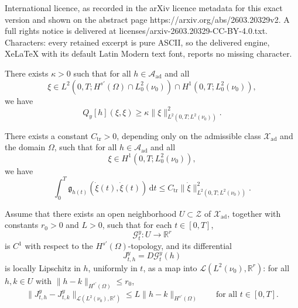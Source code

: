 \documentclass[10pt,a4paper]{amsart}
\renewcommand{\d}{\mathrm{d}}
\begin{document}
International licence, as recorded in the arXiv licence metadata for this exact version and shown on the abstract page https://arxiv.org/abs/2603.20329v2. A full rights notice is delivered at licenses/arxiv-2603.20329-CC-BY-4.0.txt. Characters: every retained excerpt is pure ASCII, so the delivered engine, XeLaTeX with its default Latin Modern text font, reports no missing character.
\begin{assumption}
    \label{ass:joint-transport-observability}
    There exists \(\kappa>0\) such that for all \(h\in \mathcal A_{\mathrm{ad}}\) and all
    \[
        \xi\in L^2(0,T;H^{s'}(\Omega)\cap L^2_0(\nu_0))
        \cap H^1(0,T;L^2_0(\nu_0)),
    \]
    we have
    \begin{equation}
        \label{eq:joint-coercivity}
        Q_y[h](\xi,\xi)
        \ge
        \kappa \|\xi\|_{L^2(0,T;L^2(\nu_0))}^2.
    \end{equation}
\end{assumption}

\begin{proposition}
    \label{prop:transport-term-upper-bound}
    There exists a constant \(C_{\mathrm{tr}}>0\), depending only on the admissible class
    \(\mathcal X_{\mathrm{ad}}\) and the domain \(\Omega\), such that for all
    \(h\in\mathcal A_{\mathrm{ad}}\) and all
    \[
        \xi\in H^1(0,T;L^2_0(\nu_0)),
    \]
    we have
    \[
        \int_0^T \mathfrak g_{h(t)}(\dot\xi(t),\dot\xi(t))\,\d t
        \le
        C_{\mathrm{tr}}\|\dot\xi\|_{L^2(0,T;L^2(\nu_0))}^2.
    \]
\end{proposition}

\begin{assumption}
    \label{ass:observation-regularity}
    Assume that there exists an open neighborhood \(U\subset \mathcal Z\) of
    \(\mathcal X_{\mathrm{ad}}\), together with constants \(r_0>0\) and \(L>0\), such that for each
    \(t\in[0,T]\),
    \[
        \mathcal G_t^y:U\to\mathbb R^r
    \]
    is \(C^1\) with respect to the \(H^{s'}(\Omega)\)-topology, and its differential
    \[
        J_{t,h}^{y}=D\mathcal G_t^y(h)
    \]
    is locally Lipschitz in \(h\), uniformly in \(t\), as a map into
    \(\mathcal L(L^2(\nu_0),\mathbb R^r)\): for all \(h,k\in U\) with
    \(\|h-k\|_{H^{s'}(\Omega)}\le r_0\),
    \begin{equation}
        \label{eq:J-lipschitz}
        \|J_{t,h}^{y}-J_{t,k}^{y}\|_{\mathcal L(L^2(\nu_0),\mathbb R^r)}
        \le
        L\|h-k\|_{H^{s'}(\Omega)}
        \qquad\text{for all } t\in[0,T].
    \end{equation}
\end{assumption}
\end{document}

